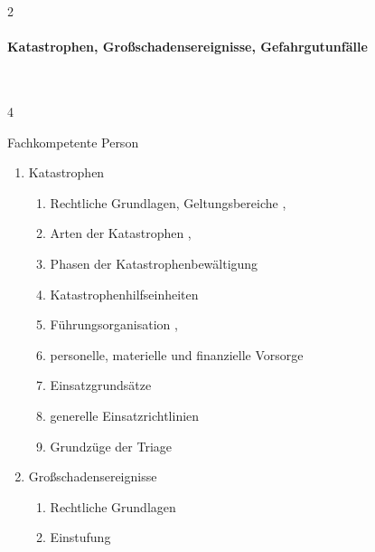 \begin{WidePar}
\begin{multicols}{2}
\begin{enumerate}
  \end{enumerate}

\paragraph{Katastrophen, Großschadensereignisse, Gefahrgutunfälle} ~
  
  \begin{inparadesc}
    \item[Stundenanzahl:]  4
    \item[Lehrkraft:]  Fachkompetente Person
  \end{inparadesc}
  
  \begin{enumerate}\item
    
    Katastrophen
    \begin{enumerate}
      \item
      Rechtliche Grundlagen,  Geltungsbereiche \dotfill {},
      \item      Arten der Katastrophen \dotfill {},
      \item      Phasen der Katastrophenbewältigung \dotfill  {}
      \item      Katastrophenhilfseinheiten \dotfill {}
      \item      Führungsorganisation \dotfill {},
      \item      personelle, materielle und finanzielle Vorsorge \dotfill {}
      \item      Einsatzgrundsätze \dotfill {}
      \item      generelle Einsatzrichtlinien \dotfill {}
      \item      Grundzüge der Triage \dotfill {}
    \end{enumerate}
    \item
    Großschadensereignisse
    \begin{enumerate}
      \item      Rechtliche Grundlagen \dotfill {}
      \item      Einstufung \dotfill {}

\end{enumerate}
\end{enumerate}
\end{multicols}
\end{WidePar}
